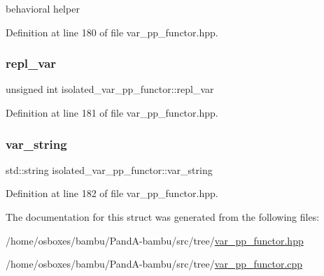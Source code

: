 behavioral helper 



Definition at line 180 of file var\+\_\+pp\+\_\+functor.\+hpp.

\mbox{\label{structisolated__var__pp__functor_aa595922ad5c226e80aed24c3d786cb25}} 
\subsubsection{\texorpdfstring{repl\+\_\+var}{repl\_var}}
{\footnotesize\ttfamily unsigned int isolated\+\_\+var\+\_\+pp\+\_\+functor\+::repl\+\_\+var\hspace{0.3cm}{\ttfamily [private]}}



Definition at line 181 of file var\+\_\+pp\+\_\+functor.\+hpp.

\mbox{\label{structisolated__var__pp__functor_a2c1ee59b62b8c4368d2e8ebdf5b98ffb}} 
\subsubsection{\texorpdfstring{var\+\_\+string}{var\_string}}
{\footnotesize\ttfamily std\+::string isolated\+\_\+var\+\_\+pp\+\_\+functor\+::var\+\_\+string\hspace{0.3cm}{\ttfamily [private]}}



Definition at line 182 of file var\+\_\+pp\+\_\+functor.\+hpp.



The documentation for this struct was generated from the following files\+:\begin{DoxyCompactItemize}
\item 
/home/osboxes/bambu/\+Pand\+A-\/bambu/src/tree/\hyperlink{var__pp__functor_8hpp}{var\+\_\+pp\+\_\+functor.\+hpp}\item 
/home/osboxes/bambu/\+Pand\+A-\/bambu/src/tree/\hyperlink{var__pp__functor_8cpp}{var\+\_\+pp\+\_\+functor.\+cpp}\end{DoxyCompactItemize}
